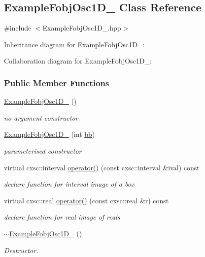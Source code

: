 \hypertarget{classExampleFobjOsc1D__3}{\subsection{\-Example\-Fobj\-Osc1\-D\-\_ \-Class \-Reference}
\label{classExampleFobjOsc1D__3}
}


{\ttfamily \#include $<$\-Example\-Fobj\-Osc1\-D\-\_.\-hpp$>$}



\-Inheritance diagram for \-Example\-Fobj\-Osc1\-D\-\_\-:


\-Collaboration diagram for \-Example\-Fobj\-Osc1\-D\-\_\-:
\subsubsection*{\-Public \-Member \-Functions}
\begin{DoxyCompactItemize}
\item 
\hyperlink{classExampleFobjOsc1D__3_a1568ff5d36376146eba2abbd5db239cb}{\-Example\-Fobj\-Osc1\-D\-\_} ()
\begin{DoxyCompactList}\small\item\em no argument constructor \end{DoxyCompactList}\item 
\hyperlink{classExampleFobjOsc1D__3_aef3ac8e4599c8d252a3169d6ecae6776}{\-Example\-Fobj\-Osc1\-D\-\_} (int \hyperlink{FShiryaev1D_8hpp_afe4fb267f5fd876bc5f069b0a76054e4}{bb})
\begin{DoxyCompactList}\small\item\em parameterised constructor \end{DoxyCompactList}\item 
virtual cxsc\-::interval \hyperlink{classExampleFobjOsc1D__3_aaa82cc2cb9f5ea65d0350caf670dae91}{operator()} (const cxsc\-::interval \&ival) const 
\begin{DoxyCompactList}\small\item\em declare function for interval image of a box \end{DoxyCompactList}\item 
virtual cxsc\-::real \hyperlink{classExampleFobjOsc1D__3_afc6b36baf992e5f36ff0739928bcfefb}{operator()} (const cxsc\-::real \&r) const 
\begin{DoxyCompactList}\small\item\em declare function for real image of reals \end{DoxyCompactList}\item 
\hyperlink{classExampleFobjOsc1D__3_a9fd82ce05b35b95429ae395b8f760ae7}{$\sim$\-Example\-Fobj\-Osc1\-D\-\_} ()
\begin{DoxyCompactList}\small\item\em \-Destructor. \end{DoxyCompactList}\end{DoxyCompactItemize}
